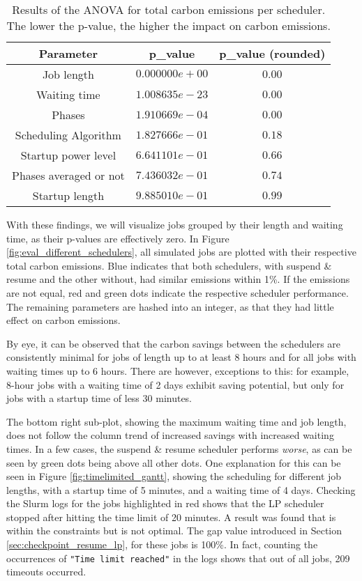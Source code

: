 \begin{table}[h!]
    \centering
    \begin{tabular}{|c|c|c|}
    \hline
        Parameter & p\_value & p\_value (rounded) \\ \hline
        Job length & $0.000000e+00$ & $0.00$ \\ \hline
        Waiting time &  $1.008635e-23$ & $0.00$ \\ \hline
        Phases &  $1.910669e-04$ & $0.00$ \\ \hline
        Scheduling Algorithm &  $1.827666e-01$ & $0.18$ \\ \hline
        Startup power level &  $6.641101e-01$ & $0.66$ \\ \hline
        Phases averaged or not &  $7.436032e-01$ & $0.74$ \\ \hline
        Startup length &  $9.885010e-01$ & $0.99$ \\ \hline
    \end{tabular}
    \caption{Results of the ANOVA for total carbon emissions per scheduler. The lower the p-value, the higher the impact on carbon emissions.}
\label{tab:scheduler_anova}
\end{table}

With these findings, we will visualize jobs grouped by their length and waiting time, as their p-values are effectively zero.
In Figure \ref{fig:eval_different_schedulers}, all simulated jobs are plotted with their respective total carbon emissions. Blue indicates that both schedulers, with suspend \& resume and the other without, had similar emissions within 1\%. 
If the emissions are not equal, red and green dots indicate the respective scheduler performance.
The remaining parameters are hashed into an integer, as that they had little effect on carbon emissions.

By eye, it can be observed that the carbon savings between the schedulers are consistently minimal for jobs of length up to at least 8 hours and for all jobs with waiting times up to 6 hours.
There are however, exceptions to this: for example, 8-hour jobs with a waiting time of 2 days exhibit saving potential, but only for jobs with a startup time of less 30 minutes.

The bottom right sub-plot, showing the maximum waiting time and job length, does not follow the column trend of increased savings with increased waiting times. In a few cases, the suspend \& resume scheduler performs \emph{worse}, as can be seen by green dots being above all other dots.
One explanation for this can be seen in Figure \ref{fig:timelimited_gantt}, showing the scheduling for different job lengths, with a startup time of 5 minutes, and a waiting time of 4 days.
Checking the Slurm logs for the jobs highlighted in red shows that the LP scheduler stopped after hitting the time limit of 20 minutes.
A result was found that is within the constraints but is not optimal.
The gap value introduced in Section \ref{sec:checkpoint_resume_lp}, for these jobs is 100\%.
In fact, counting the occurrences of \verb|"Time limit reached"| in the logs shows that out of all jobs, 209 timeouts occurred. 

